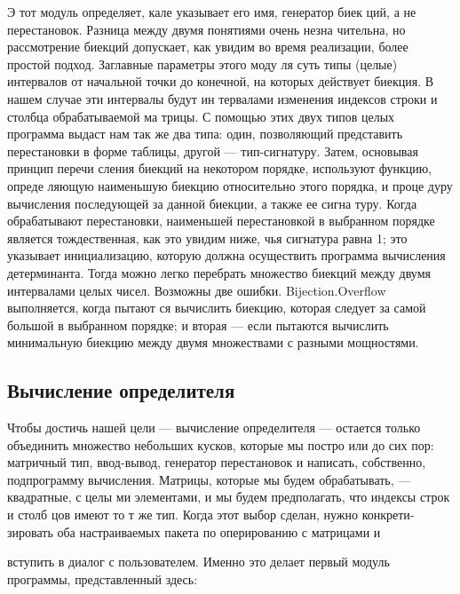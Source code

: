 \documentclass{../../template/mai_book}
\begin{document}
Э тот модуль определяет, кале указывает его имя, генератор биек­
ций, а не перестановок. Разница между двумя понятиями очень незна­
чительна, но рассмотрение биекций допускает, как увидим во время
реализации, более простой подход. Заглавные параметры этого моду­
ля суть типы (целые) интервалов от начальной точки до конечной, на
которых действует биекция. В нашем случае эти интервалы будут ин­
тервалами изменения индексов строки и столбца обрабатываемой ма­
трицы. С помощью этих двух типов целых программа выдаст нам так­
же два типа: один, позволяющий представить перестановки в форме
таблицы, другой — тип-сигнатуру. Затем, основывая принцип перечи­
сления биекций на некотором порядке, используют функцию, опреде­
ляющую наименьшую биекцию относительно этого порядка, и проце­
дуру вычисления последующей за данной биекции, а также ее сигна­
туру. Когда обрабатывают перестановки, наименьшей перестановкой
в выбранном порядке является тождественная, как это увидим ниже,
чья сигнатура равна 1; это указывает инициализацию, которую должна
осуществить программа вычисления детерминанта. Тогда можно легко
перебрать множество биекций между двумя интервалами целых чисел.
Возможны две ошибки. Bijection.Overflow выполняется, когда пытают­
ся вычислить биекцию, которая следует за самой большой в выбранном
порядке; и вторая — если пытаются вычислить минимальную биекцию
между двумя множествами с разными мощностями.

\subsection{Вычисление определителя}
Чтобы достичь нашей цели — вычисление определителя — остается
только объединить множество небольших кусков, которые мы постро­
или до сих пор: матричный тип, ввод-вывод, генератор перестановок и
написать, собственно, подпрограмму вычисления.
Матрицы, которые мы будем обрабатывать, — квадратные, с целы­
ми элементами, и мы будем предполагать, что индексы строк и столб­
цов имеют то т же тип. Когда этот выбор сделан, нужно конкрети­
зировать оба настраиваемых пакета по оперированию с матрицами и

\newpage

вступить в диалог с пользователем. Именно это делает первый модуль
программы, представленный здесь:

\end{document}
